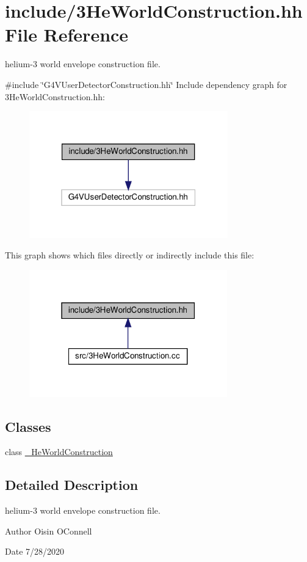 \hypertarget{3HeWorldConstruction_8hh}{}\section{include/3\+He\+World\+Construction.hh File Reference}
\label{3HeWorldConstruction_8hh}


helium-\/3 world envelope construction file.  


{\ttfamily \#include \char`\"{}G4\+V\+User\+Detector\+Construction.\+hh\char`\"{}}\newline
Include dependency graph for 3\+He\+World\+Construction.hh\+:
\nopagebreak
\begin{figure}[H]
\begin{center}
\leavevmode
\includegraphics[width=244pt]{3HeWorldConstruction_8hh__incl}
\end{center}
\end{figure}
This graph shows which files directly or indirectly include this file\+:
\nopagebreak
\begin{figure}[H]
\begin{center}
\leavevmode
\includegraphics[width=243pt]{3HeWorldConstruction_8hh__dep__incl}
\end{center}
\end{figure}
\subsection*{Classes}
\begin{DoxyCompactItemize}
\item 
class \hyperlink{class__3HeWorldConstruction}{\+\_\+He\+World\+Construction}
\end{DoxyCompactItemize}


\subsection{Detailed Description}
helium-\/3 world envelope construction file. 

\begin{DoxyAuthor}{Author}
Oisin O\textquotesingle{}Connell 
\end{DoxyAuthor}
\begin{DoxyDate}{Date}
7/28/2020 
\end{DoxyDate}
